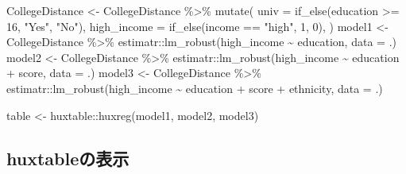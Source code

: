 \documentclass[
]{ltjsarticle}
\newenvironment{Shaded}{\begin{snugshade}}{\end{snugshade}}
\newcommand{\AttributeTok}[1]{\textcolor[rgb]{0.77,0.63,0.00}{#1}}
\newcommand{\DecValTok}[1]{\textcolor[rgb]{0.00,0.00,0.81}{#1}}
\newcommand{\FunctionTok}[1]{\textcolor[rgb]{0.00,0.00,0.00}{#1}}
\newcommand{\NormalTok}[1]{#1}
\newcommand{\OtherTok}[1]{\textcolor[rgb]{0.56,0.35,0.01}{#1}}
\newcommand{\SpecialCharTok}[1]{\textcolor[rgb]{0.00,0.00,0.00}{#1}}
\newcommand{\StringTok}[1]{\textcolor[rgb]{0.31,0.60,0.02}{#1}}
\begin{document}
\begin{Shaded}
\begin{Highlighting}[]
\NormalTok{CollegeDistance }\OtherTok{\textless{}{-}}\NormalTok{ CollegeDistance }\SpecialCharTok{\%\textgreater{}\%}
  \FunctionTok{mutate}\NormalTok{(}
    \AttributeTok{univ =} \FunctionTok{if\_else}\NormalTok{(education }\SpecialCharTok{\textgreater{}=} \DecValTok{16}\NormalTok{, }\StringTok{"Yes"}\NormalTok{, }\StringTok{"No"}\NormalTok{),}
    \AttributeTok{high\_income =} \FunctionTok{if\_else}\NormalTok{(income }\SpecialCharTok{==} \StringTok{"high"}\NormalTok{, }\DecValTok{1}\NormalTok{, }\DecValTok{0}\NormalTok{),}
\NormalTok{  )}
\NormalTok{model1 }\OtherTok{\textless{}{-}}\NormalTok{ CollegeDistance }\SpecialCharTok{\%\textgreater{}\%}
\NormalTok{  estimatr}\SpecialCharTok{::}\FunctionTok{lm\_robust}\NormalTok{(high\_income }\SpecialCharTok{\textasciitilde{}}\NormalTok{ education, }\AttributeTok{data =}\NormalTok{ .)}
\NormalTok{model2 }\OtherTok{\textless{}{-}}\NormalTok{ CollegeDistance }\SpecialCharTok{\%\textgreater{}\%}
\NormalTok{  estimatr}\SpecialCharTok{::}\FunctionTok{lm\_robust}\NormalTok{(high\_income }\SpecialCharTok{\textasciitilde{}}\NormalTok{ education }\SpecialCharTok{+}\NormalTok{ score, }\AttributeTok{data =}\NormalTok{ .)}
\NormalTok{model3 }\OtherTok{\textless{}{-}}\NormalTok{ CollegeDistance }\SpecialCharTok{\%\textgreater{}\%}
\NormalTok{  estimatr}\SpecialCharTok{::}\FunctionTok{lm\_robust}\NormalTok{(high\_income }\SpecialCharTok{\textasciitilde{}}\NormalTok{ education }\SpecialCharTok{+}\NormalTok{ score }\SpecialCharTok{+}\NormalTok{ ethnicity, }\AttributeTok{data =}\NormalTok{ .)}

\NormalTok{table }\OtherTok{\textless{}{-}}\NormalTok{ huxtable}\SpecialCharTok{::}\FunctionTok{huxreg}\NormalTok{(model1, model2, model3)}
\end{Highlighting}
\end{Shaded}

\hypertarget{huxtableux306eux8868ux793a}{%
\subsection{huxtableの表示}\label{huxtableux306eux8868ux793a}}

 
  \providecommand{\huxb}[2]{\arrayrulecolor[RGB]{#1}\global\arrayrulewidth=#2pt}
  \providecommand{\huxvb}[2]{\color[RGB]{#1}\vrule width #2pt}
  \providecommand{\huxtpad}[1]{\rule{0pt}{#1}}
  \providecommand{\huxbpad}[1]{\rule[-#1]{0pt}{#1}}
\end{document}
